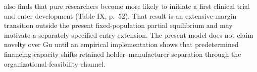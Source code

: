 \documentclass[11pt]{article}
\newcommand{\1}{\mathbf{1}}
\begin{document}
\citet{Gu2024} also finds that pure researchers become more likely to initiate
a first clinical trial and enter development (Table IX, p.~52). That result is
an extensive-margin transition outside the present fixed-population partial
equilibrium and may motivate a separately specified entry extension. The
present model does not claim novelty over Gu until an empirical implementation
shows that predetermined financing capacity shifts retained
holder--manufacturer separation through the organizational-feasibility
channel.



\clearpage


\end{document}
